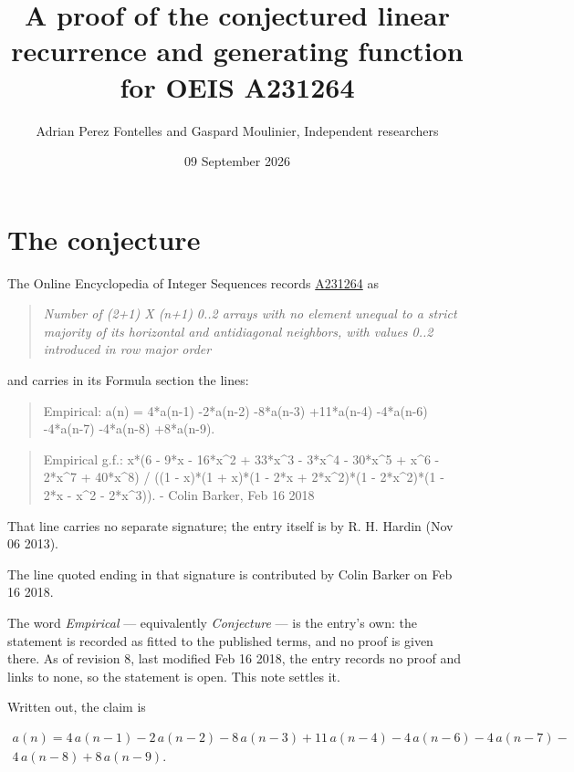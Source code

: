 \documentclass[11pt]{article}
\title{A proof of the conjectured linear recurrence and generating function for OEIS A231264}
\author{Adrian Perez Fontelles and Gaspard Moulinier, Independent researchers}
\date{09 September 2026}
\theoremstyle{definition}
\begin{document}
\maketitle
\section{The conjecture}

The Online Encyclopedia of Integer Sequences records \href{https://oeis.org/A231264}{A231264} as

\begin{quote}\itshape Number of (2+1) X (n+1) 0..2 arrays with no element unequal to a strict majority of its horizontal and antidiagonal neighbors, with values 0..2 introduced in row major order\end{quote}

and carries in its Formula section the lines:

\begin{quote}\ttfamily Empirical: a(n) = 4*a(n-1) -2*a(n-2) -8*a(n-3) +11*a(n-4) -4*a(n-6) -4*a(n-7) -4*a(n-8) +8*a(n-9).\end{quote}

\begin{quote}\ttfamily Empirical g.f.: x*(6 - 9*x - 16*x\textasciicircum{}2 + 33*x\textasciicircum{}3 - 3*x\textasciicircum{}4 - 30*x\textasciicircum{}5 + x\textasciicircum{}6 - 2*x\textasciicircum{}7 + 40*x\textasciicircum{}8) / ((1 - x)*(1 + x)*(1 - 2*x + 2*x\textasciicircum{}2)*(1 - 2*x\textasciicircum{}2)*(1 - 2*x - x\textasciicircum{}2 - 2*x\textasciicircum{}3)). - Colin Barker, Feb 16 2018\end{quote}

That line carries no separate signature; the entry itself is by R. H. Hardin (Nov 06 2013).

The line quoted ending in that signature is contributed by Colin Barker on Feb 16 2018.

The word {\itshape Empirical} --- equivalently {\itshape Conjecture} --- is the entry's own: the statement is recorded as fitted to the published terms, and no proof is given there. As of revision 8, last modified Feb 16 2018, the entry records no proof and links to none, so the statement is open. This note settles it.

Written out, the claim is

\begin{multline*} a(n) = 4\,a(n-1) - 2\,a(n-2) - 8\,a(n-3) + 11\,a(n-4) - 4\,a(n-6) - 4\,a(n-7) - \\ 4\,a(n-8) + 8\,a(n-9). \end{multline*}
\end{document}
